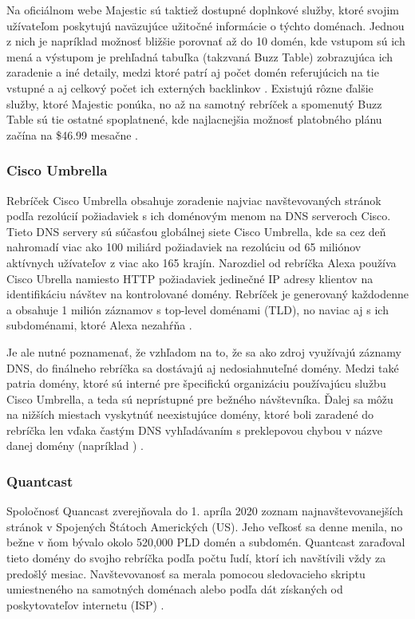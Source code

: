 Na oficiálnom webe Majestic sú taktiež dostupné doplnkové služby, ktoré svojim užívateľom poskytujú naväzujúce užitočné informácie o týchto doménach. 
Jednou z nich je napríklad možnosť bližšie porovnať až do 10 domén, kde vstupom sú ich mená a výstupom je prehľadná tabuľka (takzvaná Buzz Table) zobrazujúca ich zaradenie a iné detaily, medzi ktoré patrí aj počet domén
referujúcich na tie vstupné a aj celkový počet ich externých backlinkov \cite{majestic-million-homepage}.
Existujú rôzne ďalšie služby, ktoré Majestic ponúka, no až na samotný rebríček a spomenutý Buzz Table sú tie ostatné spoplatnené, kde najlacnejšia možnosť platobného plánu začína na \$46.99 mesačne \cite{majestic-million-pricing}.

\pagebreak

\subsubsection{Cisco Umbrella}

Rebríček Cisco Umbrella obsahuje zoradenie najviac navštevovaných stránok podľa rezolúcií požiadaviek s ich doménovým menom na DNS serveroch Cisco.
Tieto DNS servery sú súčasťou globálnej siete Cisco Umbrella, kde sa cez deň nahromadí viac ako 100 miliárd požiadaviek na rezolúciu od 65 miliónov aktívnych užívateľov z viac ako 165 krajín.
Narozdiel od rebríčka Alexa používa Cisco Ubrella namiesto HTTP požiadaviek jedinečné IP adresy klientov na identifikáciu návštev na kontrolované domény.
Rebríček je generovaný každodenne a obsahuje 1 milión záznamov s top-level doménami (TLD), no naviac aj s ich subdoménami, ktoré Alexa nezahŕňa \cite{cisco-umbrella}.

Je ale nutné poznamenať, že vzhľadom na to, že sa ako zdroj využívajú záznamy DNS, do finálneho rebríčka sa dostávajú aj nedosiahnuteľné domény.
Medzi také patria domény, ktoré sú interné pre špecifickú organizáciu používajúcu službu Cisco Umbrella, a teda sú neprístupné pre bežného návštevníka.
Ďalej sa môžu na nižších miestach vyskytnúť neexistujúce domény, ktoré boli zaradené do rebríčka len vďaka častým DNS vyhľadávaním s preklepovou chybou v názve danej domény (napríklad ) \cite{tranco-methodology}.

\subsubsection{Quantcast}

Spoločnosť Quancast zverejňovala do 1. apríla 2020 zoznam najnavštevovanejších stránok v Spojených Štátoch Amerických (US). Jeho veľkosť sa denne menila, no bežne v ňom bývalo
okolo 520,000 PLD domén a subdomén. Quantcast zaraďoval tieto domény do svojho rebríčka podľa počtu ľudí, ktorí ich navštívili vždy za predošlý mesiac.
Navštevovanosť sa merala pomocou sledovacieho skriptu umiestneného na samotných doménach alebo podľa dát získaných od poskytovateľov internetu (ISP) \cite{tranco-methodology}.

